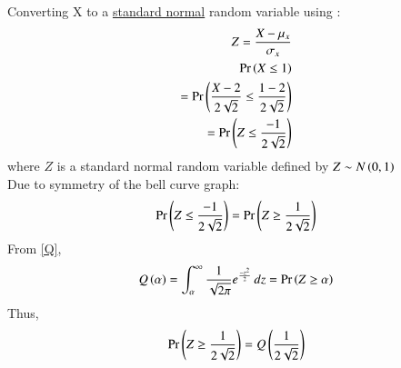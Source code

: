 \documentclass[journal,12pt,twocolumn]{IEEEtran}
\begin{document}
Converting X to a \underline{standard normal} random variable using : 
\begin{align}
   Z = \frac{X - \mu_x}{\sigma_x}\\
    \Pr\left(X\leq 1\right)\\
    = \Pr\left(\frac{X - 2}{2\sqrt{2}} \leq \frac{1-2}{2\sqrt{2}}\right)\\
     = \Pr\left(Z \leq \frac{-1}{2\sqrt{2}}\right)
\end{align}
where $Z$ is a standard normal random variable defined by $Z \sim N\left(0,1\right)$ \\
Due to symmetry of the bell curve graph:
\begin{align}
    \Pr\left(Z\leq \frac{-1}{2\sqrt{2}}\right) = \Pr\left(Z \geq \frac{1}{2\sqrt{2}}\right)
\end{align}
From \eqref{Q},
\begin{align}
    Q\left(\alpha\right) = \int_{\alpha}^{\infty} \frac{1}{\sqrt{2\pi}} e^{\frac{-z^2}{2}}\,dz = \Pr\left(Z \geq \alpha \right)
\end{align}
Thus,
\begin{align}
    \Pr\left(Z \geq \frac{1}{2\sqrt{2}}\right) = Q\left(\frac{1}{2\sqrt{2}}\right)
\end{align}
\end{document}
